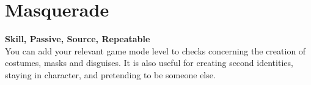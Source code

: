 \section{Masquerade}\label{sec:masquerade}
\textbf{Skill, Passive, Source, Repeatable}\\
You can add your relevant game mode level to checks concerning the creation of costumes, masks and disguises.
It is also useful for creating second identities, staying in character, and pretending to be someone else.